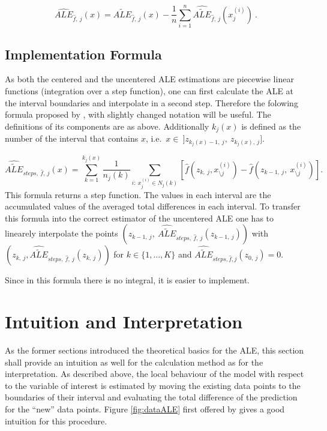 \documentclass[
]{krantz}
\begin{document}
\[ \widehat{ALE}_{\hat{f},~j}(x) = \widehat{\widetilde{ALE}}_{\hat{f},~j}(x) - \frac{1}{n} \sum_{i=1}^{n} \widehat{\widetilde{ALE}}_{\hat{f},~j}(x_j^{(i)})~. 
 \]

\hypertarget{implementation-formula}{%
\subsection{Implementation Formula}\label{implementation-formula}}

As both the centered and the uncentered ALE estimations are piecewise linear functions (integration over a step function), one can first calculate the ALE at the interval boundaries and interpolate in a second step. Therefore the folowing formula proposed by \citep[page 11]{Apley2016} , with slightly changed notation will be useful. The definitions of its components are as above. Additionally \(k_j(x)\) is defined as the number of the interval that contains \(x\), i.e.~\(x \in ~]z_{k_j(x)-1,~j},~z_{k_j(x),~j}]\).

\[  \widehat{\widetilde{ALE}}_{steps,~\hat{f},~j}(x) =  \sum_{k=1}^{k_j(x)}   \frac{1}{n_j(k)}\sum_{i:~x_j^{(i)}\in N_j(k)} [\hat{f}(z_{k,~j}, x_{\setminus j}^{(i)})-\hat{f}(z_{k-1,~j},~x_{\setminus j}^{(i)})].  \]
This formula returns a step function. The values in each interval are the accumulated values of the averaged total differences in each interval. To transfer this formula into the correct estimator of the uncentered ALE one has to linearely interpolate the points \((z_{k-1,~j},~\widehat{\widetilde{ALE}}_{steps,~\hat{f},~j}(z_{k-1,~j}))\) with \(( z_{k,~j},\widehat{\widetilde{ALE}}_{steps,~ \hat{f},~j}(z_{k,~j}))\) for \(k \in \{1, ..., K \}\) and \(\widehat{\widetilde{ALE}}_{steps, \hat{f},j}(z_{0,~j}) = 0\).

Since in this formula there is no integral, it is easier to implement.

\hypertarget{ale-intro-interpret}{%
\section{Intuition and Interpretation}\label{ale-intro-interpret}}

As the former sections introduced the theoretical basics for the ALE, this section shall provide an intuition as well for the calculation method as for the interpretation. As described above, the local behaviour of the model with respect to the variable of interest is estimated by moving the existing data points to the boundaries of their interval and evaluating the total difference of the prediction for the ``new'' data points. Figure \ref{fig:dataALE} first offered by \citep{molnar2019} gives a good intuition for this procedure.
\end{document}
